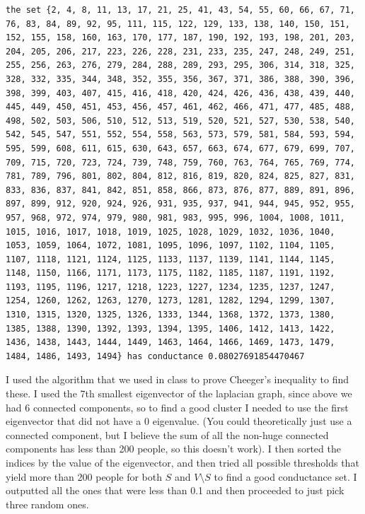 \documentclass[12pt]{article}
\begin{document}
\begin{enumerate}[leftmargin=\labelsep, label=(\alph*)]
\begin{lstlisting}
the set {2, 4, 8, 11, 13, 17, 21, 25, 41, 43, 54, 55, 60, 66, 67, 71, 76, 83, 84, 89, 92, 95, 111, 115, 122, 129, 133, 138, 140, 150, 151, 152, 155, 158, 160, 163, 170, 177, 187, 190, 192, 193, 198, 201, 203, 204, 205, 206, 217, 223, 226, 228, 231, 233, 235, 247, 248, 249, 251, 255, 256, 263, 276, 279, 284, 288, 289, 293, 295, 306, 314, 318, 325, 328, 332, 335, 344, 348, 352, 355, 356, 367, 371, 386, 388, 390, 396, 398, 399, 403, 407, 415, 416, 418, 420, 424, 426, 436, 438, 439, 440, 445, 449, 450, 451, 453, 456, 457, 461, 462, 466, 471, 477, 485, 488, 498, 502, 503, 506, 510, 512, 513, 519, 520, 521, 527, 530, 538, 540, 542, 545, 547, 551, 552, 554, 558, 563, 573, 579, 581, 584, 593, 594, 595, 599, 608, 611, 615, 630, 643, 657, 663, 674, 677, 679, 699, 707, 709, 715, 720, 723, 724, 739, 748, 759, 760, 763, 764, 765, 769, 774, 781, 789, 796, 801, 802, 804, 812, 816, 819, 820, 824, 825, 827, 831, 833, 836, 837, 841, 842, 851, 858, 866, 873, 876, 877, 889, 891, 896, 897, 899, 912, 920, 924, 926, 931, 935, 937, 941, 944, 945, 952, 955, 957, 968, 972, 974, 979, 980, 981, 983, 995, 996, 1004, 1008, 1011, 1015, 1016, 1017, 1018, 1019, 1025, 1028, 1029, 1032, 1036, 1040, 1053, 1059, 1064, 1072, 1081, 1095, 1096, 1097, 1102, 1104, 1105, 1107, 1118, 1121, 1124, 1125, 1133, 1137, 1139, 1141, 1144, 1145, 1148, 1150, 1166, 1171, 1173, 1175, 1182, 1185, 1187, 1191, 1192, 1193, 1195, 1196, 1217, 1218, 1223, 1227, 1234, 1235, 1237, 1247, 1254, 1260, 1262, 1263, 1270, 1273, 1281, 1282, 1294, 1299, 1307, 1310, 1315, 1320, 1325, 1326, 1333, 1344, 1368, 1372, 1373, 1380, 1385, 1388, 1390, 1392, 1393, 1394, 1395, 1406, 1412, 1413, 1422, 1436, 1438, 1443, 1444, 1449, 1463, 1464, 1466, 1469, 1473, 1479, 1484, 1486, 1493, 1494} has conductance 0.08027691854470467
        \end{lstlisting}
        I used the algorithm that we used in class to prove Cheeger's inequality to find these. I used the 7th smallest eigenvector of the laplacian graph, since above we had 6 connected components, so to find a good cluster I needed to use the first eigenvector that did not have a 0 eigenvalue. (You could theoretically just use a connected component, but I believe the sum of all the non-huge connected components has less than 200 people, so this doesn't work). I then sorted the indices by the value of the eigenvector, and then tried all possible thresholds that yield more than 200 people for both $S$ and $V \setminus S$ to find a good conductance set. I outputted all the ones that were less than 0.1 and then proceeded to just pick three random ones.


\end{enumerate}
\end{document}

